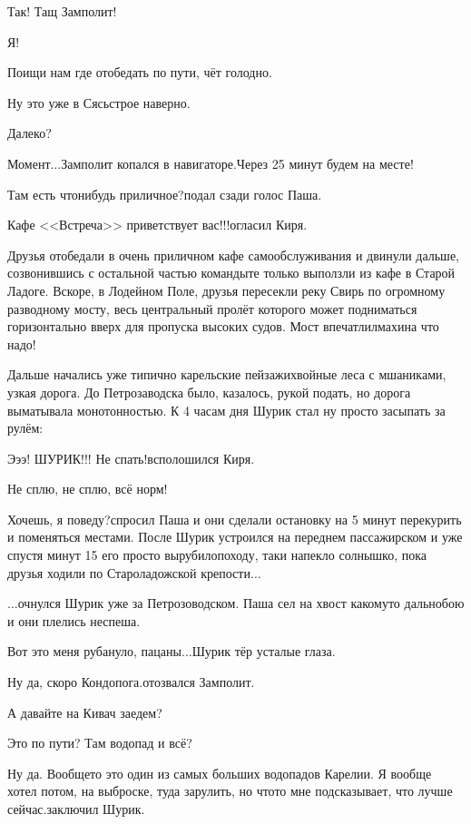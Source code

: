 \diagdash Так! Тащ Замполит!

\diagdash Я!

\diagdash Поищи нам где отобедать по пути, чёт голодно.

\diagdash Ну это уже в Сясьстрое наверно.

\diagdash Далеко?

\diagdash Момент$\ldots$\mdash Замполит копался в навигаторе.\mdash Через 25 минут будем на месте!

\diagdash Там есть что\sdash нибудь приличное?\mdash подал сзади голос Паша.

\diagdash Кафе <<Встреча>> приветствует вас!!!\mdash огласил Киря.

Друзья отобедали в очень приличном кафе самообслуживания и двинули дальше, созвонившись с остальной частью команды\mdash те только выползли из кафе в Старой Ладоге. Вскоре, в Лодейном Поле, друзья пересекли реку Свирь по огромному разводному мосту, весь центральный пролёт которого может подниматься горизонтально вверх для пропуска высоких судов. Мост впечатлил\mdash махина что надо!

Дальше начались уже типично карельские пейзажи\mdash хвойные леса с мшаниками, узкая дорога. До Петрозаводска было, казалось, рукой подать, но дорога выматывала монотонностью. К 4 часам дня Шурик стал ну просто засыпать за рулём:

\diagdash Э\sdash э\sdash э! ШУРИК!!! Не спать!\mdash всполошился Киря.

\diagdash Не сплю, не сплю, всё норм!

\diagdash Хочешь, я поведу?\mdash спросил Паша и они сделали остановку на 5 минут перекурить и поменяться местами. После Шурик устроился на переднем пассажирском и уже спустя минут 15 его просто вырубило\mdash походу, таки напекло солнышко, пока друзья ходили по Староладожской крепости$\ldots$

$\ldots$очнулся Шурик уже за Петрозоводском. Паша сел на хвост какому\sdash то дальнобою и они плелись неспеша. 

\diagdash Вот это меня рубануло, пацаны$\ldots$\mdash Шурик тёр усталые глаза.

\diagdash Ну да, скоро Кондопога.\mdash отозвался Замполит.

\diagdash А давайте на Кивач заедем?

\diagdash Это по пути? Там водопад и всё?

\diagdash Ну да. Вообще\sdash то это один из самых больших водопадов Карелии. Я вообще хотел потом, на выброске, туда зарулить, но что\sdash то мне подсказывает, что лучше сейчас.\mdash заключил Шурик.


